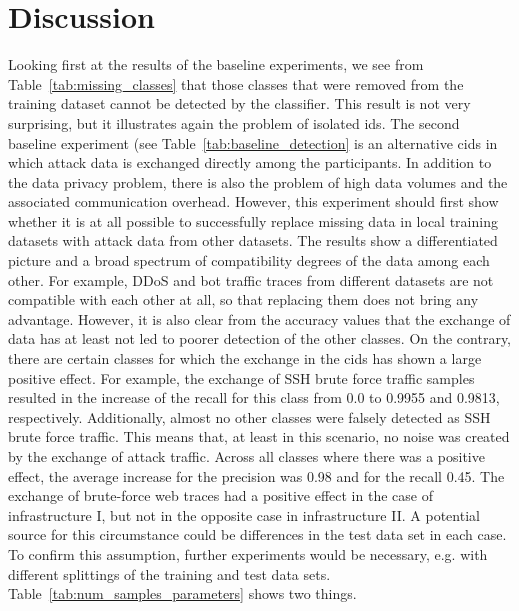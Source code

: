 \documentclass[../../main.tex]{subfiles}
\begin{document}
\section{Discussion}

Looking first at the results of the baseline experiments, we see from Table~\ref{tab:missing_classes} that those classes that were removed from the training dataset cannot be detected by the classifier. This result is not very surprising, but it illustrates again the problem of isolated \gls{ids}. The second baseline experiment (see Table~\ref{tab:baseline_detection} is an alternative \gls{cids} in which attack data is exchanged directly among the participants. In addition to the data privacy problem, there is also the problem of high data volumes and the associated communication overhead. However, this experiment should first show whether it is at all possible to successfully replace missing data in local training datasets with attack data from other datasets. The results show a differentiated picture and a broad spectrum of compatibility degrees of the data among each other. For example, DDoS and bot traffic traces from different datasets are not compatible with each other at all, so that replacing them does not bring any advantage. However, it is also clear from the accuracy values that the exchange of data has at least not led to poorer detection of the other classes. On the contrary, there are certain classes for which the exchange in the \gls{cids} has shown a large positive effect. For example, the exchange of SSH brute force traffic samples resulted in the increase of the recall for this class from 0.0 to 0.9955 and 0.9813, respectively. Additionally, almost no other classes were falsely detected as SSH brute force traffic. This means that, at least in this scenario, no noise was created by the exchange of attack traffic. Across all classes where there was a positive effect, the average increase for the precision was 0.98 and for the recall 0.45. The exchange of brute-force web traces had a positive effect in the case of infrastructure I, but not in the opposite case in infrastructure II. A potential source for this circumstance could be differences in the test data set in each case. To confirm this assumption, further experiments would be necessary, e.g. with different splittings of the training and test data sets. Table~\ref{tab:num_samples_parameters} shows two things. 
\end{document}

